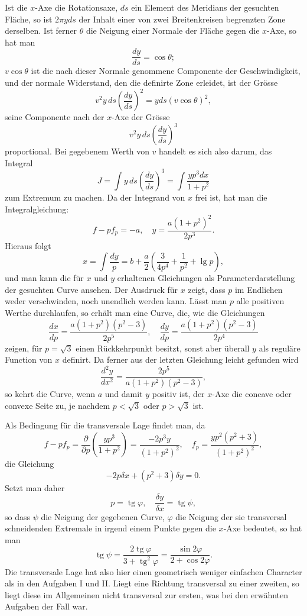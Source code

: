 \documentclass[11pt,a4paper,leqno]{article}
\begin{document}
Ist die $x$-Axe die Rotationsaxe, $ds$ ein Element des Meridians der gesuchten Fläche, so ist $2\pi yds$ der Inhalt einer von zwei Breitenkreisen begrenzten Zone derselben. Ist ferner $\theta$ die Neigung einer Normale der Fläche gegen die $x$-Axe, so hat man
\[
\frac{dy}{ds}=\cos\theta;
\]
$v\cos\theta$ ist die nach dieser Normale genommene Componente der Geschwindigkeit, und der normale Widerstand, den die definirte Zone erleidet, ist der Grösse
\[
v^2y\,ds\left(\frac{dy}{ds}\right)^2=yds(v\cos\theta)^2,
\]
seine Componente nach der $x$-Axe der Grösse
\[
v^2y\,ds\left(\frac{dy}{ds}\right)^3
\]
proportional. Bei gegebenem Werth von $v$ handelt es sich also darum, das Integral
\[
J=\int y\,ds\left(\frac{dy}{ds}\right)^3=\int \frac{yp^3dx}{1+p^2}
\]
zum Extremum zu machen. Da der Integrand von $x$ frei ist, hat man die Integralgleichung:
\begin{equation}\tag{17}
f-pf_p=-a,\quad y=\frac{a(1+p^2)^2}{2p^3}.
\end{equation}
Hieraus folgt
\begin{equation}\tag{17}
x=\int \frac{dy}{p}=b+\frac{a}{2}\left(\frac{3}{4p^4}+\frac{1}{p^2}+\operatorname{lg}p\right),
\end{equation}
und man kann die für $x$ und $y$ erhaltenen Gleichungen als Parameterdarstellung der gesuchten Curve ansehen. Der Ausdruck für $x$ zeigt, dass $p$ im Endlichen weder verschwinden, noch unendlich werden kann. Lässt man $p$ alle positiven Werthe durchlaufen, so erhält man eine Curve, die, wie die Gleichungen
\begin{equation}\tag{18}
\frac{dx}{dp}=\frac{a(1+p^2)(p^2-3)}{2p^5},\quad
\frac{dy}{dp}=\frac{a(1+p^2)(p^2-3)}{2p^4}
\end{equation}
zeigen, für $p=\sqrt{3}$ einen Rückkehrpunkt besitzt, sonst aber überall $y$ als reguläre Function von $x$ definirt. Da ferner aus der letzten Gleichung leicht gefunden wird
\[
\frac{d^2y}{dx^2}=\frac{2p^5}{a(1+p^2)(p^2-3)},
\]
so kehrt die Curve, wenn $a$ und damit $y$ positiv ist, der $x$-Axe die concave oder convexe Seite zu, je nachdem $p<\sqrt{3}$ oder $p>\sqrt{3}$ ist.

Als Bedingung für die transversale Lage findet man, da
\[
f-pf_p=\frac{\partial}{\partial p}\left(\frac{yp^3}{1+p^2}\right)=\frac{-2p^3y}{(1+p^2)^2},\quad
f_p=\frac{yp^2(p^2+3)}{(1+p^2)^2},
\]
die Gleichung
\[
-2p\delta x+(p^2+3)\delta y=0.
\]
Setzt man daher
\[
p=\operatorname{tg}\varphi,\quad \frac{\delta y}{\delta x}=\operatorname{tg}\psi,
\]
so dass $\psi$ die Neigung der gegebenen Curve, $\varphi$ die Neigung der sie transversal schneidenden Extremale in irgend einem Punkte gegen die $x$-Axe bedeutet, so hat man
\[
\operatorname{tg}\psi=\frac{2\operatorname{tg}\varphi}{3+\operatorname{tg}^2\varphi}=\frac{\sin 2\varphi}{2+\cos 2\varphi}.
\]
Die transversale Lage hat also hier einen geometrisch weniger einfachen Character als in den Aufgaben I und II. Liegt eine Richtung transversal zu einer zweiten, so liegt diese im Allgemeinen nicht transversal zur ersten, was bei den erwähnten Aufgaben der Fall war.
\end{document}
